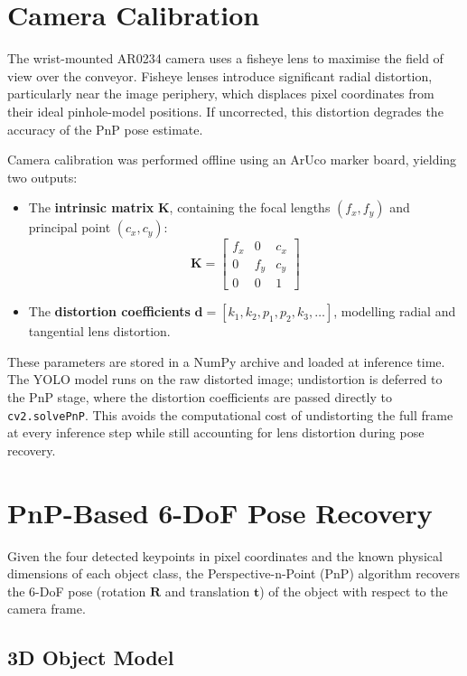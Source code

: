 \section{Camera Calibration}
\label{sec:camera_calib}

The wrist-mounted AR0234 camera uses a fisheye lens to maximise the field of view over the conveyor. Fisheye lenses introduce significant radial distortion, particularly near the image periphery, which displaces pixel coordinates from their ideal pinhole-model positions. If uncorrected, this distortion degrades the accuracy of the PnP pose estimate.

Camera calibration was performed offline using an ArUco marker board, yielding two outputs:

\begin{itemize}
    \item The \textbf{intrinsic matrix} $\mathbf{K}$, containing the focal lengths $(f_x, f_y)$ and principal point $(c_x, c_y)$:
    \[
    \mathbf{K} = \begin{bmatrix} f_x & 0 & c_x \\ 0 & f_y & c_y \\ 0 & 0 & 1 \end{bmatrix}
    \]
    \item The \textbf{distortion coefficients} $\mathbf{d} = [k_1, k_2, p_1, p_2, k_3, \ldots]$, modelling radial and tangential lens distortion.
\end{itemize}

These parameters are stored in a NumPy archive and loaded at inference time. The YOLO model runs on the raw distorted image; undistortion is deferred to the PnP stage, where the distortion coefficients are passed directly to \texttt{cv2.solvePnP}. This avoids the computational cost of undistorting the full frame at every inference step while still accounting for lens distortion during pose recovery.

\section{PnP-Based 6-DoF Pose Recovery}
\label{sec:pnp_pose}

Given the four detected keypoints in pixel coordinates and the known physical dimensions of each object class, the Perspective-n-Point (PnP) algorithm recovers the 6-DoF pose (rotation $\mathbf{R}$ and translation $\mathbf{t}$) of the object with respect to the camera frame.

\subsection{3D Object Model}

